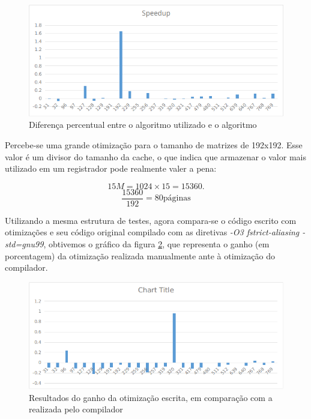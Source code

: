 \documentclass[a4paper,10pt]{article}
\begin{document}
\begin{figure}[H]
    \begin{center} 
        \includegraphics[scale=0.6]{images/speedup_2}
    \end{center}
    \caption{Diferença percentual entre o algoritmo utilizado e o algoritmo}
    \label{fig:comp}
\end{figure}

Percebe-se uma grande otimização para o tamanho de matrizes de 192x192. Esse valor é um divisor do tamanho da cache, o que indica que armazenar o valor mais utilizado em um registrador pode realmente valer a pena: 

$$
     15M = 1024\times15 = 15360.
$$
$$
     \frac{15360}{192} = 80 \text{páginas}
$$

Utilizando a mesma estrutura de testes, agora compara-se o código escrito com otimizações e seu código original compilado com as diretivas \textit{-O3 fstrict-aliasing -std=gnu99}, obtivemos o gráfico da figura \ref{fig:OxB}, que representa o ganho (em porcentagem) da otimização realizada manualmente ante à otimização do compilador.
  

\begin{figure}[H]
    \begin{center} 
        \includegraphics[scale=0.6]{images/O3xBorba}
    \end{center}
    \caption{Resultados do ganho da otimização escrita, em comparação com a realizada pelo compilador}
    \label{fig:OxB}
\end{figure}  
\end{document}
